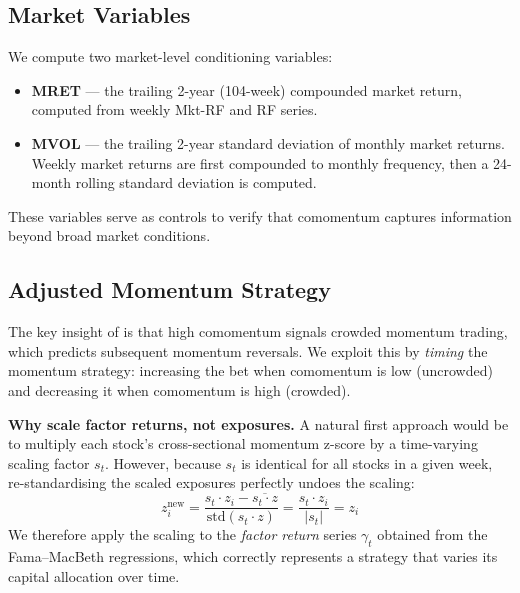 \documentclass[10pt]{article}
\begin{document}
\subsection{Market Variables}

We compute two market-level conditioning variables:
\begin{itemize}[nosep]
    \item \textbf{MRET} --- the trailing 2-year (104-week) compounded market return, computed from weekly Mkt-RF and RF series.
    \item \textbf{MVOL} --- the trailing 2-year standard deviation of monthly market returns. Weekly market returns are first compounded to monthly frequency, then a 24-month rolling standard deviation is computed.
\end{itemize}
These variables serve as controls to verify that comomentum captures information beyond broad market conditions.


\subsection{Adjusted Momentum Strategy}

The key insight of \citet{LouPolk2021} is that high comomentum signals crowded momentum trading, which predicts subsequent momentum reversals. We exploit this by \emph{timing} the momentum strategy: increasing the bet when comomentum is low (uncrowded) and decreasing it when comomentum is high (crowded).

\textbf{Why scale factor returns, not exposures.} A natural first approach would be to multiply each stock's cross-sectional momentum z-score by a time-varying scaling factor $s_t$. However, because $s_t$ is identical for all stocks in a given week, re-standardising the scaled exposures perfectly undoes the scaling:
\[
    z^{\text{new}}_i = \frac{s_t \cdot z_i - \overline{s_t \cdot z}}{\text{std}(s_t \cdot z)} = \frac{s_t \cdot z_i}{|s_t|} = z_i
\]
We therefore apply the scaling to the \emph{factor return} series $\gamma_t$ obtained from the Fama--MacBeth regressions, which correctly represents a strategy that varies its capital allocation over time.
\end{document}

